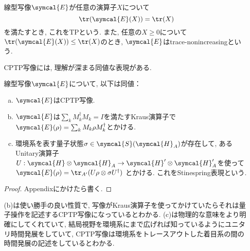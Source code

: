 \begin{mydfn}[TP写像]\label{dfn.TP-map}
  線型写像$\symcal{E}$が任意の演算子$X$について
  \begin{equation}
    \tr(\symcal{E}(X))=\tr(X)
  \end{equation}
  を満たすとき, これをTPという. 
  また, 任意の$X\geq 0$について$\tr(\symcal{E}(X))\leq\tr(X)$のとき, $\symcal{E}$はtrace-nonincreasingという. 
\end{mydfn}

CPTP写像には, 理解が深まる同値な表現がある. 

\begin{mythm}[CPTP写像の同値な表現]\label{thm.CPTP-map}
  線型写像$\symcal{E}$について, 以下は同値：
  \begin{enumerate}[(a). ]
    \item $\symcal{E}$はCPTP写像. 
    \item $\symcal{E}$は$\sum_{k}M_k^{\dag}M_k=I$を満たすKraus演算子で$\symcal{E}(\rho)=\sum_{k}M_k\rho M_k^{\dag}$とかける. 
    \item 環境系を表す量子状態$\sigma\in\symcal{S}(\symcal{H}_A)$が存在して, あるUnitary演算子$U:\symcal{H}\otimes \symcal{H}_A\to \symcal{H}'\otimes \symcal{H}_A'$を使って
      $\symcal{E}(\rho)=\tr_{A'}(U\rho\otimes\sigma U^{\dag})$
    とかける. 
    これをStinespring表現という. 
  \end{enumerate}
\end{mythm}

\begin{proof}
  Appendixにかけたら書く. 
\end{proof}

(b)は使い勝手の良い性質で, 写像がKraus演算子を使ってかけていたらそれは量子操作を記述するCPTP写像になっているとわかる. 
(c)は物理的な意味をより明確にしてくれていて, 結局視野を環境系にまで広げれば知っているようにユニタリ時間発展をしていて, CPTP写像は環境系をトレースアウトした着目系の間の時間発展の記述をしているとわかる. 